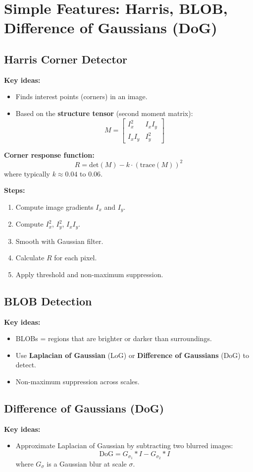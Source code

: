 \documentclass[a4paper,11pt]{article}
\begin{document}
\newpage
\section{Simple Features: Harris, BLOB, Difference of Gaussians (DoG)}

\subsection{Harris Corner Detector}
\textbf{Key ideas:}
\begin{itemize}
    \item Finds interest points (corners) in an image.
    \item Based on the \textbf{structure tensor} (second moment matrix):
    \[
    M = \begin{bmatrix}
    I_x^2 & I_x I_y \\
    I_x I_y & I_y^2
    \end{bmatrix}
    \]
\end{itemize}

\textbf{Corner response function:}
\[
R = \text{det}(M) - k \cdot (\text{trace}(M))^2
\]
where typically $k \approx 0.04$ to $0.06$.

\textbf{Steps:}
\begin{enumerate}
    \item Compute image gradients $I_x$ and $I_y$.
    \item Compute $I_x^2$, $I_y^2$, $I_x I_y$.
    \item Smooth with Gaussian filter.
    \item Calculate $R$ for each pixel.
    \item Apply threshold and non-maximum suppression.
\end{enumerate}

\subsection{BLOB Detection}
\textbf{Key ideas:}
\begin{itemize}
    \item BLOBs = regions that are brighter or darker than surroundings.
    \item Use \textbf{Laplacian of Gaussian} (LoG) or \textbf{Difference of Gaussians} (DoG) to detect.
    \item Non-maximum suppression across scales.
\end{itemize}

\subsection{Difference of Gaussians (DoG)}
\textbf{Key ideas:}
\begin{itemize}
    \item Approximate Laplacian of Gaussian by subtracting two blurred images:
    \[
    \text{DoG} = G_{\sigma_1} * I - G_{\sigma_2} * I
    \]
    where $G_\sigma$ is a Gaussian blur at scale $\sigma$.
\end{itemize}
\end{document}
